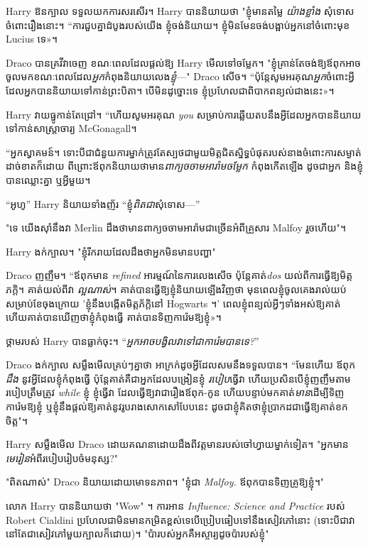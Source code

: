 Harry ឱនក្បាល ទទួលយកការសរសើរ។ Harry បាននិយាយថា "ខ្ញុំមានតម្លៃ \emph{យ៉ាងខ្លាំង} សុំទោសចំពោះរឿងនោះ។ “ការ​ជួប​គ្នា​ដំបូង​របស់​យើង ខ្ញុំ​ចង់​និយាយ។ ខ្ញុំ​មិន​មែន​ចង់​បង្អាប់​អ្នក​នៅ​ចំពោះ​មុខ Lucius ទេ»។

Draco បានគ្រវីវាចេញ ខណៈពេលដែលផ្តល់ឱ្យ Harry មើលទៅចម្លែក។ "ខ្ញុំគ្រាន់តែចង់ឱ្យឪពុកអាចចូលមកខណៈពេលដែល\emph{អ្នក}កំពុងនិយាយលេង\emph{ខ្ញុំ}—" Draco សើច។ “ប៉ុន្តែសូមអរគុណ\emph{អ្នក}ចំពោះអ្វីដែលអ្នកបាននិយាយទៅកាន់ព្រះបិតា។ បើ​មិន​ដូច្នោះ​ទេ ខ្ញុំ​ប្រហែល​ជា​ពិបាក​ពន្យល់​ជាង​នេះ»។

Harry វាយធ្នូកាន់តែជ្រៅ។ “ហើយ​សូម​អរគុណ \emph{you} សម្រាប់​ការ​ឆ្លើយ​តប​នឹង​អ្វី​ដែល​អ្នក​បាន​និយាយ​ទៅ​កាន់​សាស្ត្រាចារ្យ McGonagall។

“អ្នក​ស្វាគមន៍។ ទោះបីជាជំនួយការម្នាក់ត្រូវតែស្បថជាមួយមិត្តជិតស្និទ្ធបំផុតរបស់នាងចំពោះការសម្ងាត់ដាច់ខាតក៏ដោយ ពីព្រោះឪពុកនិយាយថាមាន\emph{ពាក្យចចាមអារ៉ាមចម្លែក} កំពុងកើតឡើង ដូចជាអ្នក និងខ្ញុំបានឈ្លោះគ្នា ឬអ្វីមួយ។

“អូហូ” Harry និយាយទាំងញ័រ “ខ្ញុំ\emph{ពិតជា}សុំទោស—”

"ទេ យើងស៊ាំនឹងវា Merlin ដឹងថាមានពាក្យចចាមអារ៉ាមជាច្រើនអំពីគ្រួសារ Malfoy រួចហើយ"។

Harry ងក់ក្បាល។ "ខ្ញុំរីករាយដែលដឹងថាអ្នកមិនមានបញ្ហា"

Draco ញញឹម។ “ឪពុកមាន \emph{refined} អារម្មណ៍នៃការលេងសើច ប៉ុន្តែគាត់\emph{dos} យល់ពីការធ្វើឱ្យមិត្តភក្តិ។ គាត់យល់ពីវា \emph{ល្អណាស់}។ គាត់​បាន​ធ្វើ​ឱ្យ​ខ្ញុំ​និយាយ​ឡើងវិញ​ថា មុនពេល​ខ្ញុំ​ចូល​គេង​រាល់​យប់​សម្រាប់​ខែ​ចុងក្រោយ 'ខ្ញុំនឹង​បង្កើត​មិត្តភ័ក្តិ​នៅ Hogwarts ។' ពេល​ខ្ញុំ​ពន្យល់​អ្វីៗ​ទាំងអស់​ឱ្យ​គាត់ ហើយ​គាត់​បាន​ឃើញ​ថា​ខ្ញុំ​កំពុង​ធ្វើ គាត់​បាន​ទិញ​ការ៉េម​ឱ្យ​ខ្ញុំ»។

ថ្គាមរបស់ Harry បានធ្លាក់ចុះ។ “\emph{អ្នកអាចបង្វិលវាទៅជាការ៉េមបានទេ?}”

Draco ងក់ក្បាល សម្លឹងមើលគ្រប់ៗគ្នាថា អាក្រក់ដូចអ្វីដែលសមនឹងទទួលបាន។ “មែនហើយ ឪពុក \emph{ដឹង} នូវអ្វីដែលខ្ញុំកំពុងធ្វើ ប៉ុន្តែគាត់គឺជាអ្នកដែលបង្រៀនខ្ញុំ \emph{របៀប}ធ្វើវា ហើយប្រសិនបើខ្ញុំញញឹមតាមរបៀបត្រឹមត្រូវ \emph{while} ខ្ញុំ ខ្ញុំធ្វើវា ដែលធ្វើឱ្យវាជារឿងឪពុក-កូន ហើយបន្ទាប់មកគាត់\emph{មាន}ដើម្បីទិញការ៉េមឱ្យខ្ញុំ ឬខ្ញុំនឹងផ្តល់ឱ្យគាត់នូវរូបរាងសោកសៅបែបនេះ ដូចជាខ្ញុំគិតថាខ្ញុំប្រាកដជាធ្វើឱ្យគាត់ខកចិត្ត"។

Harry សម្លឹងមើល Draco ដោយគណនាដោយដឹងពីវត្តមានរបស់ចៅហ្វាយម្នាក់ទៀត។ "អ្នកមាន\emph{មេរៀន}អំពីរបៀបរៀបចំមនុស្ស?"

"ពិតណាស់" Draco និយាយដោយមោទនភាព។ "ខ្ញុំជា \emph{ Malfoy.} ឪពុកបានទិញគ្រូឱ្យខ្ញុំ។"

លោក Harry បាននិយាយថា "Wow" ។ ការអាន \emph{Influence: Science and Practice} របស់ Robert Cialdini ប្រហែលជាមិនមានកម្រិតខ្ពស់ទេបើប្រៀបធៀបទៅនឹងសៀវភៅនោះ (ទោះបីជាវានៅតែជាសៀវភៅមួយក្បាលក៏ដោយ)។ "ប៉ារបស់អ្នកគឺអស្ចារ្យដូចប៉ារបស់ខ្ញុំ"

